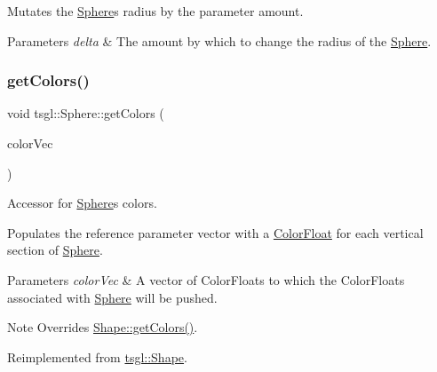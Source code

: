 Mutates the \hyperlink{classtsgl_1_1_sphere}{Sphere}\textquotesingle{}s radius by the parameter amount. 


\begin{DoxyParams}{Parameters}
{\em delta} & The amount by which to change the radius of the \hyperlink{classtsgl_1_1_sphere}{Sphere}. \\
\hline
\end{DoxyParams}
\mbox{\label{classtsgl_1_1_sphere_a767bfb1b0c6c29d0577377aa0403d881}} 
\subsubsection{\texorpdfstring{get\+Colors()}{getColors()}}
{\footnotesize\ttfamily void tsgl\+::\+Sphere\+::get\+Colors (\begin{DoxyParamCaption}\item[{std\+::vector$<$ \hyperlink{structtsgl_1_1_color_float}{Color\+Float} $>$ \&}]{color\+Vec }\end{DoxyParamCaption})\hspace{0.3cm}{\ttfamily [virtual]}}



Accessor for \hyperlink{classtsgl_1_1_sphere}{Sphere}\textquotesingle{}s colors. 

Populates the reference parameter vector with a \hyperlink{structtsgl_1_1_color_float}{Color\+Float} for each vertical section of \hyperlink{classtsgl_1_1_sphere}{Sphere}. 
\begin{DoxyParams}{Parameters}
{\em color\+Vec} & A vector of Color\+Floats to which the Color\+Floats associated with \hyperlink{classtsgl_1_1_sphere}{Sphere} will be pushed. \\
\hline
\end{DoxyParams}
\begin{DoxyNote}{Note}
Overrides \hyperlink{classtsgl_1_1_shape_a6f54fe4d049f69a287edf8335a9509f8}{Shape\+::get\+Colors()}. 
\end{DoxyNote}


Reimplemented from \hyperlink{classtsgl_1_1_shape_a6f54fe4d049f69a287edf8335a9509f8}{tsgl\+::\+Shape}.

\mbox{\label{classtsgl_1_1_sphere_aa0870a70e34c6c77e2d61e50dbf3cc07}} 

